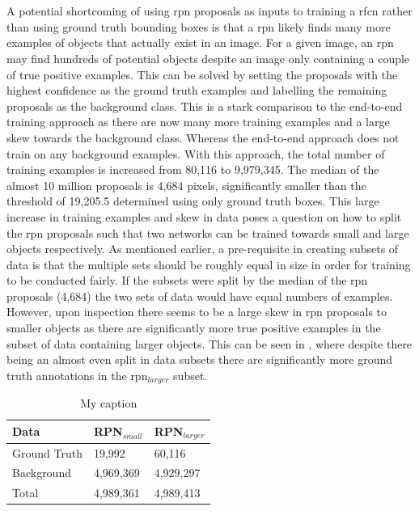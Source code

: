 \\\\
A potential shortcoming of using \gls{rpn} proposals as inputs to training a \gls{rfcn} rather than using ground truth bounding boxes is that a \gls{rpn} likely finds many more examples of objects that actually exist in an image. For a given image, an \gls{rpn} may find hundreds of potential objects despite an image only containing a couple of true positive examples. This can be solved by setting the proposals with the highest confidence as the ground truth examples and labelling the remaining proposals as the background class. This is a stark comparison to the end-to-end training approach as there are now many more training examples and a large skew towards the background class. Whereas the end-to-end approach does not train on any background examples. With this approach, the total number of training examples is increased from 80,116 to 9,979,345. The median of the almost 10 million proposals is 4,684 pixels, significantly smaller than the threshold of 19,205.5 determined using only ground truth boxes. This large increase in training examples and skew in data poses a question on how to split the \gls{rpn} proposals such that two networks can be trained towards small and large objects respectively. As mentioned earlier, a pre-requisite in creating subsets of data is that the multiple sets should be roughly equal in size in order for training to be conducted fairly. If the subsets were split by the median of the \gls{rpn} proposals (4,684) the two sets of data would have equal numbers of examples. However, upon inspection there seems to be a large skew in \gls{rpn} proposals to smaller objects as there are significantly more true positive examples in the subset of data containing larger objects. This can be seen in , where despite there being an almost even split in data subsets there are significantly more ground truth annotations in the \gls{rpn}$_{larger}$ subset.

\begin{table}[h]
\centering
\caption{My caption}
\label{tab:splitrpn}
\begin{tabular}{|l|l|l|}
\hline
\textbf{Data} & \textbf{RPN$_{small}$} & \textbf{RPN$_{larger}$} \\ \hline
Ground Truth & 19,992    & 60,116     \\ 
Background   & 4,969,369 & 4,929,297  \\ \hline
Total        & 4,989,361 & 4,989,413  \\ \hline
\end{tabular}
\end{table}

